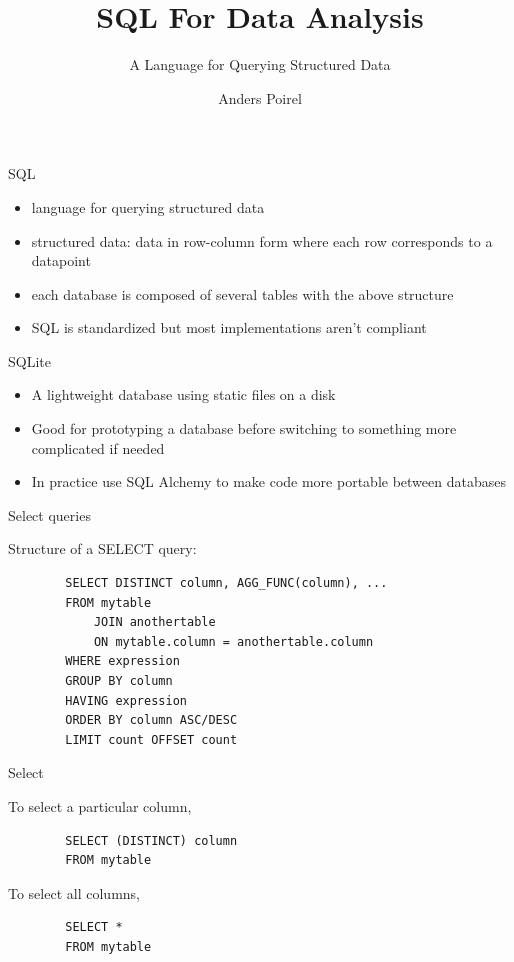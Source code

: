 \documentclass{beamer}
\title{SQL For Data Analysis}
\subtitle{A Language for Querying Structured Data}
\author{Anders Poirel}
\institute{Data Science @ SC}
\begin{document}
\maketitle

    \begin{frame}{SQL}
        \begin{itemize}
            \item language for querying \alert{structured data}
            \item \alert{structured} data: data in row-column form where each row corresponds to a datapoint
            \item each database is composed of several \alert{tables} with the above structure
            \item SQL is standardized but most implementations aren't compliant
        \end{itemize}   
    \end{frame}


    \begin{frame}{SQLite}
        \begin{itemize}
            \item A lightweight database using static files on a disk
            \item Good for prototyping a database before switching to something more complicated if needed
            \item In practice use \alert{SQL Alchemy} to make code more portable between databases
        \end{itemize}   
    \end{frame}
    
    \begin{frame}[fragile]{Select queries}
    
        Structure of a \alert{SELECT} query:
        \begin{verbatim}
        SELECT DISTINCT column, AGG_FUNC(column), ...
        FROM mytable
            JOIN anothertable
            ON mytable.column = anothertable.column
        WHERE expression
        GROUP BY column
        HAVING expression
        ORDER BY column ASC/DESC 
        LIMIT count OFFSET count
        \end{verbatim}

    \end{frame}

    \begin{frame}[fragile]{Select}

        To select a \alert{particular} column,
        \begin{verbatim}
        SELECT (DISTINCT) column
        FROM mytable
        \end{verbatim}

        To select \alert{all} columns,
        \begin{verbatim}
        SELECT *
        FROM mytable
        \end{verbatim}

    \end{frame}
\end{document}
